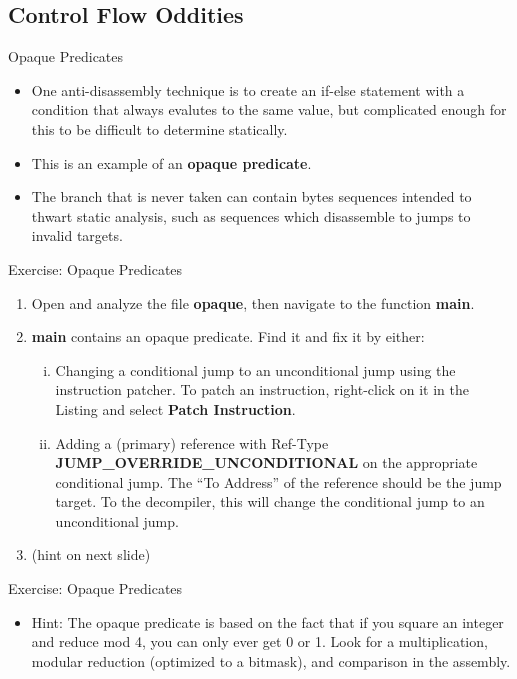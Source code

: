 \documentclass{beamer}
\begin{document}
\subsection{Control Flow Oddities}
\begin{frame}
\begin{block}{Opaque Predicates}
\begin{itemize}
\item One anti-disassembly technique is to create an if-else statement with a condition that always evalutes to the same value, but complicated enough for this to be difficult to
determine statically.
\item  This is an example of an \textbf{opaque predicate}.
\item  The branch that is never taken can contain bytes sequences intended to thwart static analysis, such as sequences which disassemble to jumps to invalid targets.
\end{itemize}
\end{block}
\end{frame}

\begin{frame}
\begin{block}{Exercise: Opaque Predicates}
\begin{enumerate}
\item Open and analyze the file \textbf{opaque}, then navigate to the function \textbf{main}.
\item \textbf{main} contains an opaque predicate.  Find it and fix it by either:
\begin{enumerate}[(i)]
\item Changing a conditional jump to an unconditional jump using the instruction patcher.  To patch an instruction, right-click on it in the Listing and select \textbf{Patch Instruction}.
\item Adding a (primary) reference with Ref-Type \textbf{JUMP\_OVERRIDE\_UNCONDITIONAL} on the appropriate conditional jump. The ``To Address'' of the reference should be the jump target.
 To the decompiler, this will change the conditional jump to an unconditional jump.
\end{enumerate}
\item[] (hint on next slide)
\end{enumerate}
\end{block}
\end{frame}

\begin{frame}
\begin{block}{Exercise: Opaque Predicates}
\begin{itemize}
\item Hint: The opaque predicate is based on the fact that if you square an integer and reduce mod 4, you can only ever get 0 or 1.  Look for a multiplication, modular reduction (optimized to a bitmask), and comparison in the assembly.
\end{itemize}
\end{block}
\end{frame}
\end{document}
